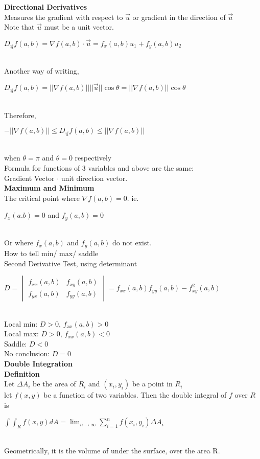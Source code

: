 \documentclass[10pt, a4paper]{article}
\begin{document}
\begin{multicols*}{3}
   \textbf{Directional Derivatives}\\
   Measures the gradient with respect to $\overrightarrow{u}$ or gradient in the direction of $\overrightarrow{u}$\\
   Note that $\overrightarrow{u}$ must be a unit vector.\\
   \centerline{$D_{\overrightarrow{u}}f(a, b) = \nabla f(a, b) \cdot \overrightarrow{u} = f_x(a, b)u_1 + f_y(a, b)u_2$}\\
   
   Another way of writing,\\
   \centerline{$D_{\overrightarrow{u}}f(a, b) = ||\nabla f(a, b)||||\overrightarrow{u}||\cos{\theta} = ||\nabla f(a, b)||\cos{\theta}$} \\
   Therefore, \\
   \centerline{$-||\nabla f(a, b)|| \leq D_{\overrightarrow{u}}f(a, b) \leq ||\nabla f(a, b)||$}\\
   when $\theta = \pi$ and $\theta = 0$ respectively\\
   Formula for functions of 3 variables and above are the same:\\
   Gradient Vector $\cdot$ unit direction vector.\\
   
   \textbf{Maximum and Minimum}\\
   The critical point where $\nabla f(a, b) = 0$. ie.\\
   \centerline{$f_x(a. b) = 0$ and $f_y(a, b) = 0$}\\
   Or where $f_x(a, b)$ and $f_y(a, b)$ do not exist.\\
   
   How to tell min/ max/ saddle\\
   Second Derivative Test, using determinant\\
   \centerline{$D = \begin{vmatrix} f_{xx}(a, b) & f_{xy}(a, b)\\ f_{yx}(a, b) & f_{yy}(a, b) \end{vmatrix} = f_{xx}(a, b)f_{yy}(a, b) - f_{xy}^2(a, b)$}\\
   
   Local min: $D > 0$, $f_{xx}(a, b) > 0$\\
   Local max: $D > 0$, $f_{xx}(a, b) < 0$\\
   Saddle: $D < 0$\\
   No conclusion: $D = 0$\\
   
   {\normalsize\textbf{Double Integration}}\\
   \textbf{Definition}\\
   Let $\Delta A_i$ be the area of $R_i$ and $(x_i, y_i)$ be a point in $R_i$\\
   let $f(x, y)$ be a function of two variables. Then the double integral of $f$ over $R$ is\\
   \centerline{$\int \int_{R} f(x, y) dA = \lim_{n \to \infty} \sum_{i = 1}^{n} f(x_i, y_i) \Delta A_i$}\\
   Geometrically, it is the volume of under the surface, over the area R.\\
   

\end{multicols*}
\end{document}
